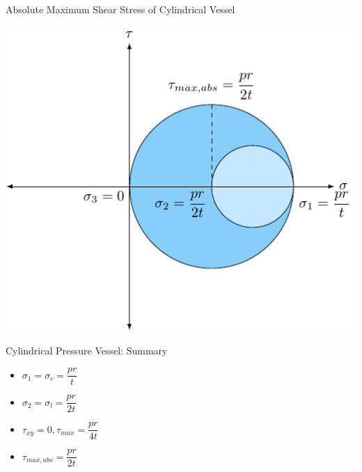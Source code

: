\documentclass[10pt, svgnames]{beamer}
\begin{document}
\begin{frame}[label={sec:org9eaf518}]{Absolute Maximum Shear Stress of Cylindrical Vessel}
\begin{center}
\includegraphics[height=0.8\textheight]{pictures/abs-max-shear-cyl-vessel.pdf}
\end{center}
\end{frame}

\begin{frame}[label={sec:org1b727a1}]{Cylindrical Pressure Vessel: Summary}
\begin{itemize}
\item \(\sigma_1 = \sigma_c = \dfrac{pr}{t}\)
\item \(\sigma_2 = \sigma_l = \dfrac{pr}{2t}\)
\item \(\tau_{xy} = 0, \tau_{max} = \dfrac{pr}{4t}\)
\item \(\tau_{max,abs} = \dfrac{pr}{2t}\)
\end{itemize}
\end{frame}
\end{document}
